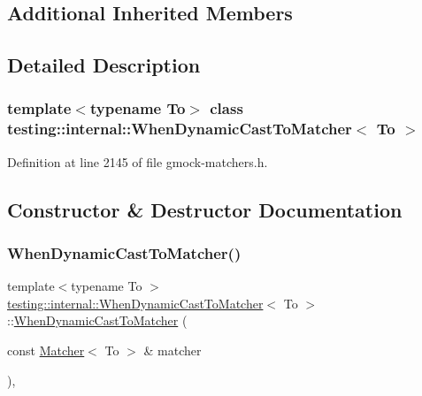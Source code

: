 \subsection*{Additional Inherited Members}


\subsection{Detailed Description}
\subsubsection*{template$<$typename To$>$\newline
class testing\+::internal\+::\+When\+Dynamic\+Cast\+To\+Matcher$<$ To $>$}



Definition at line 2145 of file gmock-\/matchers.\+h.



\subsection{Constructor \& Destructor Documentation}
\mbox{\label{classtesting_1_1internal_1_1WhenDynamicCastToMatcher_a44e444d218197f8180c5ac7fca135f9a}} 
\subsubsection{\texorpdfstring{When\+Dynamic\+Cast\+To\+Matcher()}{WhenDynamicCastToMatcher()}}
{\footnotesize\ttfamily template$<$typename To $>$ \\
\hyperlink{classtesting_1_1internal_1_1WhenDynamicCastToMatcher}{testing\+::internal\+::\+When\+Dynamic\+Cast\+To\+Matcher}$<$ To $>$\+::\hyperlink{classtesting_1_1internal_1_1WhenDynamicCastToMatcher}{When\+Dynamic\+Cast\+To\+Matcher} (\begin{DoxyParamCaption}\item[{const \hyperlink{classtesting_1_1Matcher}{Matcher}$<$ To $>$ \&}]{matcher }\end{DoxyParamCaption})\hspace{0.3cm}{\ttfamily [inline]}, {\ttfamily [explicit]}}



